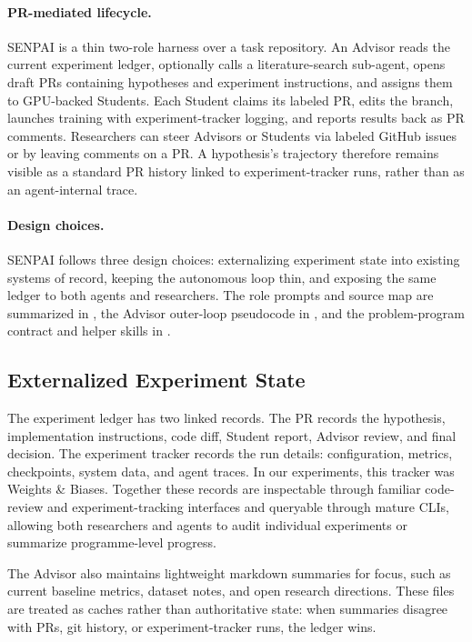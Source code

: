 \documentclass{article}
\begin{document}
\paragraph{PR-mediated lifecycle.}
SENPAI is a thin two-role harness over a task repository. An Advisor reads the current experiment ledger, optionally calls a literature-search sub-agent, opens draft PRs containing hypotheses and experiment instructions, and assigns them to GPU-backed Students. Each Student claims its labeled PR, edits the branch, launches training with experiment-tracker logging, and reports results back as PR comments. Researchers can steer Advisors or Students via labeled GitHub issues or by leaving comments on a PR. A hypothesis's trajectory therefore remains visible as a standard PR history linked to experiment-tracker runs, rather than as an agent-internal trace.

\paragraph{Design choices.}
SENPAI follows three design choices: externalizing experiment state into existing systems of record, keeping the autonomous loop thin, and exposing the same ledger to both agents and researchers. The role prompts and source map are summarized in , the Advisor outer-loop pseudocode in , and the problem-program contract and helper skills in .

\subsection{Externalized Experiment State}

The experiment ledger has two linked records. The PR records the hypothesis, implementation instructions, code diff, Student report, Advisor review, and final decision. The experiment tracker records the run details: configuration, metrics, checkpoints, system data, and agent traces. In our experiments, this tracker was Weights \& Biases. Together these records are inspectable through familiar code-review and experiment-tracking interfaces and queryable through mature CLIs, allowing both researchers and agents to audit individual experiments or summarize programme-level progress.

The Advisor also maintains lightweight markdown summaries for focus, such as current baseline metrics, dataset notes, and open research directions. These files are treated as caches rather than authoritative state: when summaries disagree with PRs, git history, or experiment-tracker runs, the ledger wins.
\end{document}
